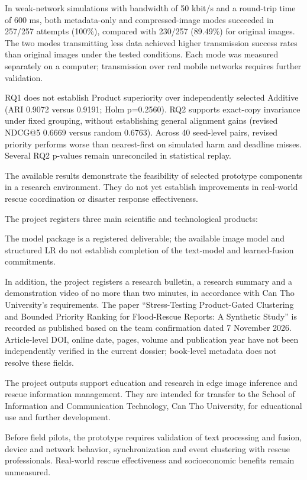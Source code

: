 In weak-network simulations with bandwidth of 50 kbit/s and a round-trip time of 600 ms, both metadata-only and compressed-image modes succeeded in 257/257 attempts (100\%), compared with 230/257 (89.49\%) for original images. The two modes transmitting less data achieved higher transmission success rates than original images under the tested conditions. Each mode was measured separately on a computer; transmission over real mobile networks requires further validation.

RQ1 does not establish Product superiority over independently selected Additive (ARI 0.9072 versus 0.9191; Holm p=0.2560). RQ2 supports exact-copy invariance under fixed grouping, without establishing general alignment gains (revised NDCG@5 0.6669 versus random 0.6763). Across 40 seed-level pairs, revised priority performs worse than nearest-first on simulated harm and deadline misses. Several RQ2 p-values remain unreconciled in statistical replay.

The available results demonstrate the feasibility of selected prototype components in a research environment. They do not yet establish improvements in real-world rescue coordination or disaster response effectiveness.

The project registers three main scientific and technological products:
\par\noindent The model package is a registered deliverable; the available image model and structured LR do not establish completion of the text-model and learned-fusion commitments.
\par\noindent In addition, the project registers a research bulletin, a research summary and a demonstration video of no more than two minutes, in accordance with Can Tho University's requirements. The paper ``Stress-Testing Product-Gated Clustering and Bounded Priority Ranking for Flood-Rescue Reports: A Synthetic Study'' is recorded as published based on the team confirmation dated 7 November 2026. Article-level DOI, online date, pages, volume and publication year have not been independently verified in the current dossier; book-level metadata does not resolve these fields.

The project outputs support education and research in edge image inference and rescue information management. They are intended for transfer to the School of Information and Communication Technology, Can Tho University, for educational use and further development.

Before field pilots, the prototype requires validation of text processing and fusion, device and network behavior, synchronization and event clustering with rescue professionals. Real-world rescue effectiveness and socioeconomic benefits remain unmeasured.
